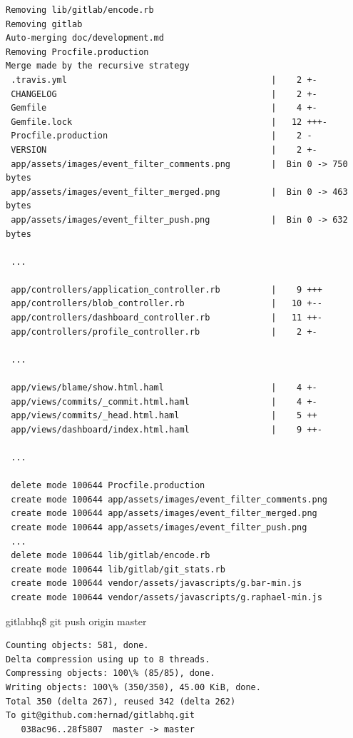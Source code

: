\begin{lstlisting}
Removing lib/gitlab/encode.rb
Removing gitlab
Auto-merging doc/development.md
Removing Procfile.production
Merge made by the recursive strategy
 .travis.yml                                        |    2 +-
 CHANGELOG                                          |    2 +-
 Gemfile                                            |    4 +-
 Gemfile.lock                                       |   12 +++-
 Procfile.production                                |    2 -
 VERSION                                            |    2 +-
 app/assets/images/event_filter_comments.png        |  Bin 0 -> 750 bytes
 app/assets/images/event_filter_merged.png          |  Bin 0 -> 463 bytes
 app/assets/images/event_filter_push.png            |  Bin 0 -> 632 bytes
 
 ...

 app/controllers/application_controller.rb          |    9 +++
 app/controllers/blob_controller.rb                 |   10 +--
 app/controllers/dashboard_controller.rb            |   11 ++-
 app/controllers/profile_controller.rb              |    2 +-

 ...

 app/views/blame/show.html.haml                     |    4 +-
 app/views/commits/_commit.html.haml                |    4 +-
 app/views/commits/_head.html.haml                  |    5 ++
 app/views/dashboard/index.html.haml                |    9 ++-
 
 ... 
 
 delete mode 100644 Procfile.production
 create mode 100644 app/assets/images/event_filter_comments.png
 create mode 100644 app/assets/images/event_filter_merged.png
 create mode 100644 app/assets/images/event_filter_push.png
 ...
 delete mode 100644 lib/gitlab/encode.rb
 create mode 100644 lib/gitlab/git_stats.rb
 create mode 100644 vendor/assets/javascripts/g.bar-min.js
 create mode 100644 vendor/assets/javascripts/g.raphael-min.js
\end{lstlisting}



gitlabhq\$ git push origin master

\begin{lstlisting}
Counting objects: 581, done.
Delta compression using up to 8 threads.
Compressing objects: 100\% (85/85), done.
Writing objects: 100\% (350/350), 45.00 KiB, done.
Total 350 (delta 267), reused 342 (delta 262)
To git@github.com:hernad/gitlabhq.git
   038ac96..28f5807  master -> master

\end{lstlisting}




